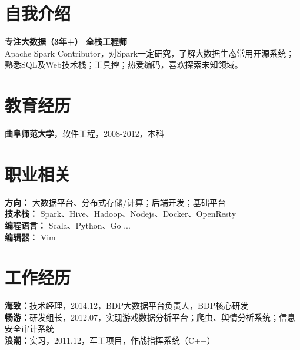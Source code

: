 \documentclass[UTF8,margin,line]{res}
\begin{document}

\begin{resume}

\section{\sc 自我介绍}
\textbf{专注大数据（3年+） 全栈工程师} \\
Apache Spark Contributor，对Spark一定研究，了解大数据生态常用开源系统； \\
熟悉SQL及Web技术栈；工具控；热爱编码，喜欢探索未知领域。

\section{\sc 教育经历}
\textbf{曲阜师范大学}，软件工程，2008-2012，本科

\section{\sc 职业相关}
\textbf{方向：} 大数据平台、分布式存储/计算；后端开发；基础平台 \\
\textbf{技术栈：} Spark、Hive、Hadoop、Nodejs、Docker、OpenResty \\
\textbf{编程语言：} Scala、Python、Go ... \\
\textbf{编辑器：} Vim

\section{\sc 工作经历}
\textbf{海致：}技术经理，2014.12，BDP大数据平台负责人，BDP核心研发 \\
\textbf{畅游：}研发组长，2012.07，实现游戏数据分析平台；爬虫、舆情分析系统；信息安全审计系统 \\
\textbf{浪潮：}实习，2011.12，军工项目，作战指挥系统（C++）


\end{resume}
\end{document}
